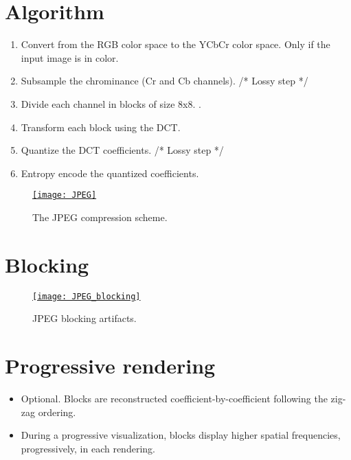 \section{Algorithm}
\begin{enumerate}
\item Convert from the \gls{RGB} color space to the \gls{YCbCr} color
  space. Only if the input image is in color.
\item Subsample the chrominance (Cr and Cb channels). /* Lossy step */
\item Divide each channel in blocks of size 8x8. .
\item Transform each block using the \gls{DCT}.
\item Quantize the \gls{DCT} coefficients. /* Lossy step */
\item Entropy encode the quantized coefficients.
\end{enumerate}

\begin{figure}%
  \centering
  \href{https://link.springer.com/article/10.1007/s40799-019-00358-4}{\texttt{[image: JPEG]}}
  \caption{The \gls{JPEG} compression scheme.}
  \label{fig:JPEG_compressor}
\end{figure}

\section{Blocking}
\begin{figure}[H]
  \centering
  \href{https://thesai.org/Publications/ViewPaper?Volume=6&Issue=4&Code=ijacsa&SerialNo=16}{\texttt{[image: JPEG\_blocking]}}
  \caption{\gls{JPEG} blocking artifacts.}
  \label{fig:JPEG_blocking}
\end{figure}

\section{Progressive rendering}
\begin{itemize}
\item Optional. Blocks are reconstructed coefficient-by-coefficient following the zig-zag ordering.
\item During a progressive visualization, blocks display higher
  spatial frequencies, progressively, in each rendering.
\end{itemize}

